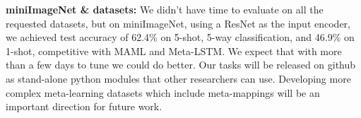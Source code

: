 \documentclass{article}
\begin{document}
\vspace{-0.1em}
\textbf{miniImageNet \& datasets:} We didn't have time to evaluate on all the requested datasets, but on miniImageNet, using a ResNet as the input encoder, we achieved test accuracy of 62.4\% on 5-shot, 5-way classification, and 46.9\% on 1-shot, competitive with MAML and Meta-LSTM. We expect that with more than a few days to tune we could do better. Our tasks will be released on github as stand-alone python modules that other researchers can use. Developing more complex meta-learning datasets which include meta-mappings will be an important direction for future work.\par
\end{document}
